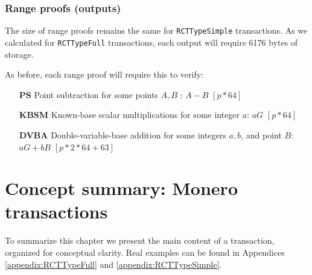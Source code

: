 \subsubsection*{Range proofs (outputs)}

The size of range proofs remains the same for {\tt RCTTypeSimple} transactions. As we calculated for {\tt RCTTypeFull} transactions, each output will require 6176 bytes of storage.

As before, each range proof will require this to verify:

\begin{itemize}
    \setlength\itemsep{\listspace}
    \item [\textbf{PS}] Point subtraction for some points $A, B$ : $A - B$ \quad \([p*64]\)
    \item [\textbf{KBSM}] Known-base scalar multiplications for some integer $a$: $a G$ \quad \([p*64]\)
    \item [\textbf{DVBA}] Double-variable-base addition for some integers $a, b$, and point $B$: $a G + b B$ \quad \([p*2*64 + 63]\)
\end{itemize}


\newpage
\section{Concept summary: Monero transactions}
\label{sec:transaction_summary}

To summarize this chapter we present the main content of a transaction, organized for conceptual clarity. Real examples can be found in Appendices \ref{appendix:RCTTypeFull} and \ref{appendix:RCTTypeSimple}.

